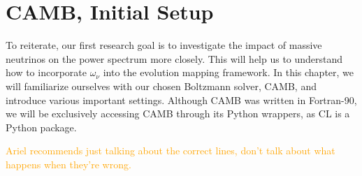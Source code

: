 \chapter{CAMB, Initial Setup}

To reiterate, our first research goal is to investigate the impact of massive
neutrinos on the power spectrum more closely. This will help us to understand
how to incorporate $\omega_\nu$ into the evolution mapping framework.
In this chapter, we will familiarize ourselves with our chosen Boltzmann 
solver, CAMB, and introduce various important settings. Although CAMB was
written in Fortran-90, we will be exclusively accessing CAMB through its
Python wrappers, as CL is a Python package. 

\begin{comment}
\textcolor{blue}{
I hope to, in painstaking detail, cover many of the lines of the code that I
have written to interface with CAMB. I will include plots to indicate, at
every step, what incorrect settings cause the power spectrum to look like (or,
for subtler errors, what the error curves looked like compared to Ariel's
results, which I treated as a sort of ``ground truth''). This should also be a
good example to flex my physics interpretation skills: why does this incorrect
setting produce this undesired pattern?}

\textcolor{blue}{You might think that this is sort of an inappropriate 
section
for a master's thesis (especially since I have in mind that this be a lengthy 
section), but I would like to include it unless you feel very strongly. After
all, I spent several months of the project debugging at least ten different 
ways that slight and major errors in the various settings led to 
irreconcilable results.}
\end{comment}

\textcolor{orange}{Ariel recommends
just talking about the correct lines, don't talk about what happens when
they're wrong.}

\begin{comment}
In figure \ref{fig: spectrum_type}, we can see that requesting of the wrong
power spectrum type can in some low-$\omega_\nu$ cases yields errors so low
that we might accidentally overlook them. This error pattern is easily
recognizable and is a consequence of the definition of the power spectrum: the
Fourier transform  of the two-point correlation function. ...Okay, I'm still 
thinking about this. I don't understand %
\end{comment}

